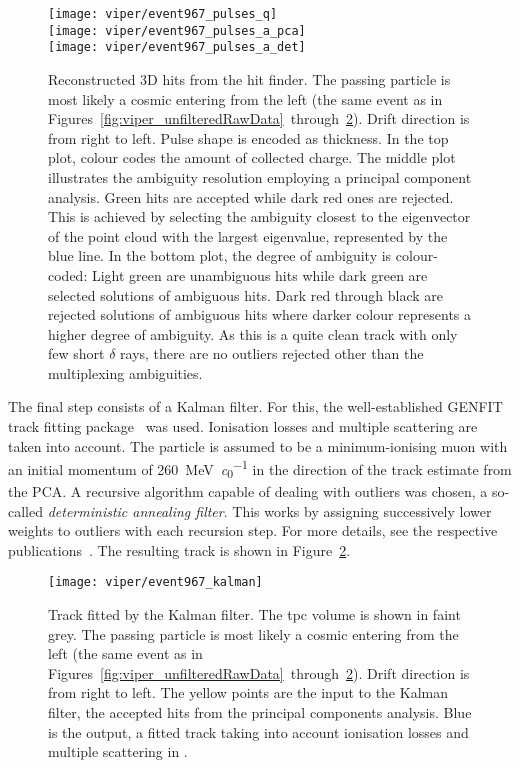 \begin{figure}[htb]
	\centering
	\texttt{[image: viper/event967\_pulses\_q]} \\
	\texttt{[image: viper/event967\_pulses\_a\_pca]} \\
	\texttt{[image: viper/event967\_pulses\_a\_det]}
	\caption{Reconstructed 3D hits from the hit finder.
		The passing particle is most likely a cosmic \Pgm entering from the left (the same event as in Figures~\ref{fig:viper_unfilteredRawData}~through~\ref{fig:viper_kalman}).
		Drift direction is from right to left.
		Pulse shape is encoded as thickness.
		In the top plot, colour codes the amount of collected charge.
		The middle plot illustrates the ambiguity resolution employing a principal component analysis.
		Green hits are accepted while dark red ones are rejected.
		This is achieved by selecting the ambiguity closest to the eigenvector of the point cloud with the largest eigenvalue, represented by the blue line.
		In the bottom plot, the degree of ambiguity is colour-coded: Light green are unambiguous hits while dark green are selected solutions of ambiguous hits.
		Dark red through black are rejected solutions of ambiguous hits where darker colour represents a higher degree of ambiguity.
		As this is a quite clean track with only few short $\delta$ rays, there are no outliers rejected other than the multiplexing ambiguities.}
	\label{fig:viper_pca}
\end{figure}

The final step consists of a Kalman filter.
For this, the well-established GENFIT track fitting package~\cite{genfit1, genfit2} was used.
Ionisation losses and multiple scattering are taken into account.
The particle is assumed to be a minimum-ionising muon with an initial momentum of \SI{260}{\mega\electronvolt\per\clight} in the direction of the track estimate from the PCA.
A recursive algorithm capable of dealing with outliers was chosen, a so-called \emph{deterministic annealing filter}.
This works by assigning successively lower weights to outliers with each recursion step.
For more details, see the respective publications~\cite{genfit1, genfit2}.
The resulting track is shown in Figure~\ref{fig:viper_kalman}.

\begin{figure}[htb]
	\centering
	\texttt{[image: viper/event967\_kalman]}
	\caption{Track fitted by the Kalman filter.
	The \gls{tpc} volume is shown in faint grey.
	The passing particle is most likely a cosmic \Pgm entering from the left (the same event as in Figures~\ref{fig:viper_unfilteredRawData}~through~\ref{fig:viper_kalman}).
	Drift direction is from right to left.
	The yellow points are the input to the Kalman filter, the accepted hits from the principal components analysis.
	Blue is the output, a fitted track taking into account ionisation losses and multiple scattering in \lar{}.}
	\label{fig:viper_kalman}
\end{figure}

